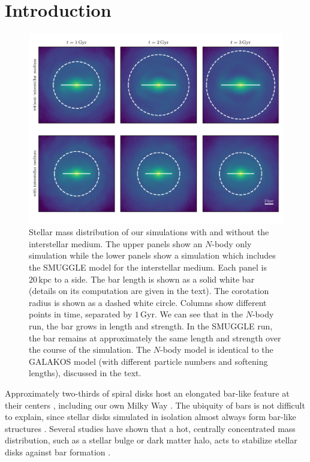 \documentclass[twocolumn,linenumbers,trackchanges]{aastex631}
\newcommand{\Nbody}{$N$-body}
\newcommand{\SMUGGLE}{SMUGGLE}
\begin{document}
\section{Introduction}
\label{sec:intro}
\begin{figure}
    \centering
    \includegraphics[width=\textwidth]{fig/fig1.pdf}
    \caption{Stellar mass distribution of our simulations with and without
    the interstellar medium. The upper panels show an \Nbody{} only simulation
    while the lower panels show a simulation which includes the \SMUGGLE{} model
    for the interstellar medium. Each panel is $20\,\textrm{kpc}$ to a side.
    The bar length is shown as a solid white bar (details on its
    computation are given in the text). The corotation radius is shown as a
    dashed white circle. Columns show different points in time, separated by
    $1\,\textrm{Gyr}$. We can see that in the \Nbody{} run, the bar grows in
    length and strength. In the \SMUGGLE{} run, the bar remains at approximately
    the same length and strength over the course of the simulation. The \Nbody{}
    model is identical to the GALAKOS model (with different particle
    numbers and softening lengths), discussed in the text.}\label{fig:overview}
\end{figure}

Approximately two-thirds of spiral disks host an elongated bar-like feature at
their centers \citep{2000AJ....119..536E, 2007ApJ...657..790M}, including our
own Milky Way \citep{1957AJ.....62...19J, 1991ApJ...379..631B}. The ubiquity of
bars is not difficult to explain, since stellar disks simulated in isolation
almost always form bar-like structures \citep{1971ApJ...168..343H}. Several
studies have shown that a hot, centrally concentrated mass distribution,
such as a stellar bulge or dark matter halo, acts to stabilize stellar disks
against bar formation \citep[e.g.,][]{1973ApJ...186..467O, 1976AJ.....81...30H}.
\end{document}
